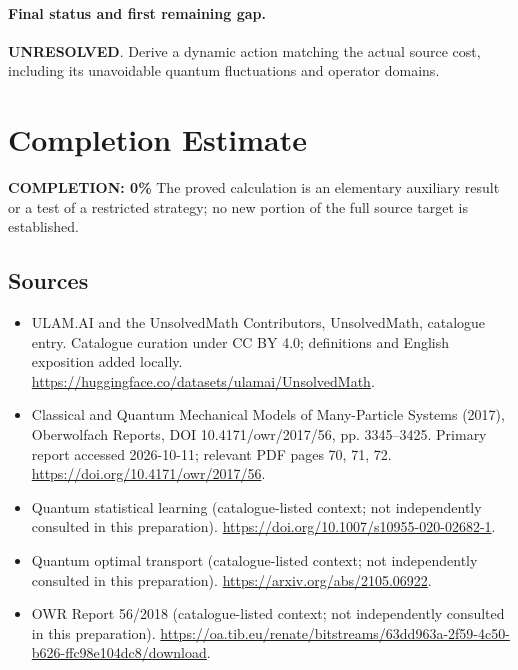 \documentclass[11pt]{article}
\begin{document}
\paragraph{Final status and first remaining gap.}
\textbf{UNRESOLVED}. Derive a dynamic action matching the actual source cost, including its unavoidable quantum fluctuations and operator domains.

\section{Completion Estimate}
\noindent\textbf{COMPLETION: 0\%}
The proved calculation is an elementary auxiliary result or a test of a restricted strategy; no new portion of the full source target is established.

\subsection{Sources}
\begin{itemize}
\item[\hypertarget{source:statement:1}{S1}] ULAM.AI and the UnsolvedMath Contributors, UnsolvedMath, catalogue entry. Catalogue curation under CC BY 4.0; definitions and English exposition added locally.
\url{https://huggingface.co/datasets/ulamai/UnsolvedMath}.
\item[\hypertarget{source:statement:2}{S2}] Classical and Quantum Mechanical Models of Many-Particle Systems (2017), Oberwolfach Reports, DOI 10.4171/owr/2017/56, pp. 3345--3425. Primary report accessed 2026-10-11; relevant PDF pages 70, 71, 72.
\url{https://doi.org/10.4171/owr/2017/56}.
\item[\hypertarget{source:statement:3}{S3}] Quantum statistical learning (catalogue-listed context; not independently consulted in this preparation).
\url{https://doi.org/10.1007/s10955-020-02682-1}.
\item[\hypertarget{source:statement:4}{S4}] Quantum optimal transport (catalogue-listed context; not independently consulted in this preparation).
\url{https://arxiv.org/abs/2105.06922}.
\item[\hypertarget{source:statement:5}{S5}] OWR Report 56/2018 (catalogue-listed context; not independently consulted in this preparation).
\url{https://oa.tib.eu/renate/bitstreams/63dd963a-2f59-4c50-b626-ffc98e104dc8/download}.
\end{itemize}
\label{end:statement}
\end{document}
